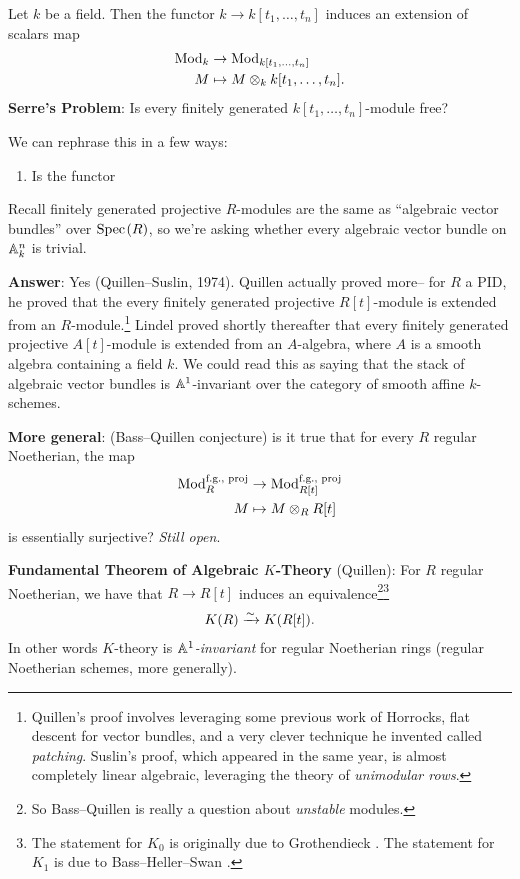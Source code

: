 \documentclass[11pt,openany]{book}
\begin{document}
\begin{example} Let $k$ be a field. Then the functor $k \to k[t_1, \ldots, t_n]$ induces an extension of scalars map
\begin{equation}\label{eqn:extn-scalars}
\begin{aligned}
    \mathrm{Mod}_k &\to \mathrm{Mod}_{k[t_1, \ldots, t_n]} \\
    M &\mapsto M \otimes_k k[t_1, \ldots, t_n].
\end{aligned}
\end{equation}
\textbf{Serre's Problem}: Is every finitely generated $k[t_1, \ldots, t_n]$-module free?

We can rephrase this in a few ways:
\begin{enumerate}
    \item Is the functor
\end{enumerate}



Recall finitely generated projective $R$-modules are the same as ``algebraic vector bundles'' over $\text{Spec}\hspace{0.1em}(R)$, so we're asking whether every algebraic vector bundle on $\mathbb{A}^n_k$ is trivial.

\textbf{Answer}: Yes (Quillen--Suslin, 1974). Quillen actually proved more-- for $R$ a PID, he proved that the every finitely generated projective $R[t]$-module is extended from an $R$-module.\footnote{%
Quillen's proof involves leveraging some previous work of Horrocks, flat descent for vector bundles, and a very clever technique he invented called \textit{patching}. Suslin's proof, which appeared in the same year, is almost completely linear algebraic, leveraging the theory of \textit{unimodular rows}.} Lindel proved shortly thereafter that every finitely generated projective $A[t]$-module is extended from an $A$-algebra, where $A$ is a smooth algebra containing a field $k$. We could read this as saying that the stack of algebraic vector bundles is $\mathbb{A}^1$-invariant over the category of smooth affine $k$-schemes.
\end{example}

\textbf{More general}: (Bass--Quillen conjecture) is it true that for every $R$ regular Noetherian, the map
\begin{align*}
    \mathrm{Mod}_R^{\text{f.g., proj}} &\to \mathrm{Mod}_{R[t]}^{\text{f.g., proj}} \\
    M &\mapsto M \otimes_R R[t]
\end{align*}
is essentially surjective? \textit{Still open}.

\textbf{Fundamental Theorem of Algebraic $K$-Theory} (Quillen): For $R$ regular Noetherian, we have that $R \to R[t]$ induces an equivalence\footnote{%
So Bass--Quillen is really a question about \textit{unstable} modules.}\footnote{%
The statement for $K_0$ is originally due to Grothendieck \cite[5.6.1.3]{Asok-A1AG}. The statement for $K_1$ is due to Bass--Heller--Swan \cite[5.8.2.1]{Asok-A1AG}.
}
\begin{align*}
    K(R) \xrightarrow{\sim} K(R[t]).
\end{align*}
%
In other words $K$-theory is \textit{$\mathbb{A}^1$-invariant} for regular Noetherian rings (regular Noetherian schemes, more generally).
\end{document}
